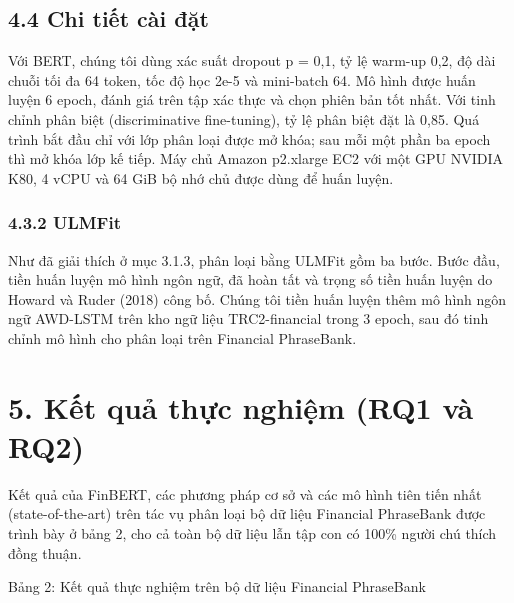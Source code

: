 \subsection{4.4 Chi tiết cài đặt}

Với BERT, chúng tôi dùng xác suất dropout p = 0,1, tỷ lệ warm-up 0,2, độ dài chuỗi tối đa 64 token, tốc độ học 2e-5 và mini-batch 64. Mô hình được huấn luyện 6 epoch, đánh giá trên tập xác thực và chọn phiên bản tốt nhất. Với tinh chỉnh phân biệt (discriminative fine-tuning), tỷ lệ phân biệt đặt là 0,85. Quá trình bắt đầu chỉ với lớp phân loại được mở khóa; sau mỗi một phần ba epoch thì mở khóa lớp kế tiếp. Máy chủ Amazon p2.xlarge EC2 với một GPU NVIDIA K80, 4 vCPU và 64 GiB bộ nhớ chủ được dùng để huấn luyện.

\subsubsection{4.3.2 ULMFit}

Như đã giải thích ở mục 3.1.3, phân loại bằng ULMFit gồm ba bước. Bước đầu, tiền huấn luyện mô hình ngôn ngữ, đã hoàn tất và trọng số tiền huấn luyện do Howard và Ruder (2018) công bố. Chúng tôi tiền huấn luyện thêm mô hình ngôn ngữ AWD-LSTM trên kho ngữ liệu TRC2-financial trong 3 epoch, sau đó tinh chỉnh mô hình cho phân loại trên Financial PhraseBank.

\section{5. Kết quả thực nghiệm (RQ1 và RQ2)}

Kết quả của FinBERT, các phương pháp cơ sở và các mô hình tiên tiến nhất (state-of-the-art) trên tác vụ phân loại bộ dữ liệu Financial PhraseBank được trình bày ở bảng 2, cho cả toàn bộ dữ liệu lẫn tập con có 100\% người chú thích đồng thuận.

Bảng 2: Kết quả thực nghiệm trên bộ dữ liệu Financial PhraseBank

